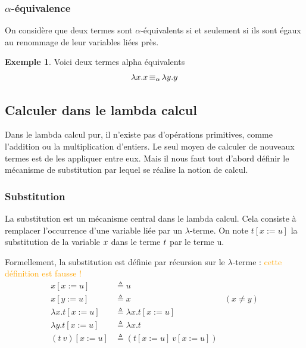 \documentclass {article}
\theoremstyle{definition}
\newtheorem{example}{Exemple}
\theoremstyle{remark}
\newcommand{\attention}[1]{\textcolor{orange}{#1}}
\begin{document}
\subsubsection{$\alpha$-équivalence}
\label{alpha_equiv}

\newcommand{\equivAlpha}{\mathop{\equiv_\alpha}}

On considère que deux termes sont \(\alpha\)-équivalents si et seulement si ils sont 
égaux au renommage de leur variables liées près. 
\begin{example}
  Voici deux termes alpha équivalents 
  \begin{align*}
    & \Lam{x}{\Var{x}} \equivAlpha \Lam{y}{\Var{y}} \\
  \end{align*}
\end{example}
  
\subsection{Calculer dans le lambda calcul}
\label{calculer_dans_le_lambda_calcul}

Dans le lambda calcul pur, il n'existe pas d'opérations primitives, comme l'addition ou la multiplication d'entiers. Le seul moyen de calculer de nouveaux termes est de les appliquer 
entre eux. Mais il nous faut tout d'abord définir le mécanisme de substitution par lequel se réalise la notion de calcul.

\subsubsection{Substitution}

\newcommand{\subst}[3]{#1[#2 := #3]}


La substitution est un mécanisme central dans le lambda calcul. Cela consiste 
à remplacer l'occurrence d'une variable liée par un \(\lambda\)-terme.
On note \(\subst{t}{x}{u}\) la substitution de la variable $x$ dans le terme $t$ par le 
terme u.

Formellement, la substitution est définie par récursion sur le $\lambda$-terme : \attention{cette définition est fausse !}
\begin{align*}
    \subst{x}{x}{u} &\triangleq u \\
    \subst{x}{y}{u} &\triangleq x & (x \neq y)\\
    \subst{\lambda x.t}{x}{u} &\triangleq \lambda x.\subst{t}{x}{u} \\
    \subst{\lambda y.t}{x}{u} &\triangleq \lambda x.t \\
    \subst{(t\: v)}{x}{u} &\triangleq (\subst{t}{x}{u}\: \subst{v}{x}{u}) 
\end{align*}
\end{document}
